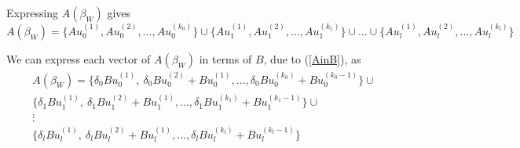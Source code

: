 Expressing $A(\beta_W)$ gives 
\begin{equation}
A(\beta_W)=\{Au_{0}^{(1)},Au_{0}^{(2)},\dots,Au_{0}^{(k_0)}\} \cup \{Au_{1}^{(1)},Au_{1}^{(2)},\dots,Au_{1}^{(k_1)}\} \cup \dots \cup \{Au_{l}^{(1)},Au_{l}^{(2)},\dots,Au_{l}^{(k_l)}\} 
 \end{equation}

We can express each vector of $A(\beta_W)$ in terms of $B$, due to (\ref{AinB}), as
\begin{align*}
A(\beta_W)=\{\delta_0 Bu_{0}^{(1)},\ \delta_0 Bu_{0}^{(2)}+Bu_{0}^{(1)},\dots,\delta_0 Bu_{0}^{(k_0)}+Bu_{0}^{(k_0-1)}\} \cup\\
\{\delta_1 Bu_{1}^{(1)},\ \delta_1Bu_{1}^{(2)}+Bu_{1}^{(1)},\dots,\delta_1 Bu_{1}^{(k_1)}+Bu_{1}^{(k_1-1)}\} \cup\\
\vdots\\
\{\delta_l Bu_{l}^{(1)},\ \delta_lBu_{l}^{(2)}+Bu_{l}^{(1)},\dots,\delta_l Bu_{l}^{(k_l)}+Bu_{l}^{(k_l-1)}\}\quad
 \end{align*}

